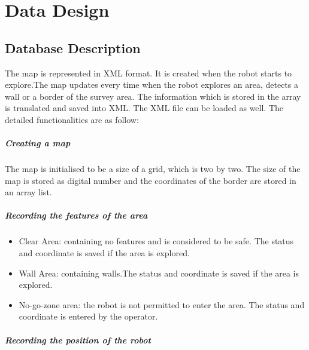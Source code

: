 \documentclass[11pt, a4paper]{report}
\begin{document}
\pagebreak


\chapter{Data Design}%
\label{cha:DD1}

\section{Database Description}
The map is represented in XML format. It is created when the robot starts to explore.The map updates every time when the robot explores an area, detects
a wall or a border of the survey area. The information which is stored in the array is translated
and saved into XML. The XML file can be loaded as well. The detailed functionalities are
as follow:

\paragraph{Creating a map}

The map is initialised to be a size of a grid, which is two by two.
The size of the map is stored as digital number and the coordinates of the border are stored in an
array list.

\paragraph{Recording the features of the area}

\begin{itemize}
  \item  Clear Area: containing no features and is considered to be safe. The status and coordinate
   is saved if the area is explored.
\item	Wall Area: containing walls.The status and coordinate is saved if the area is explored.
\item  No-go-zone area: the robot is not permitted to enter the area. The status and coordinate is 
entered by the operator.
\end{itemize}

\paragraph{Recording the position of the robot}
\end{document}
